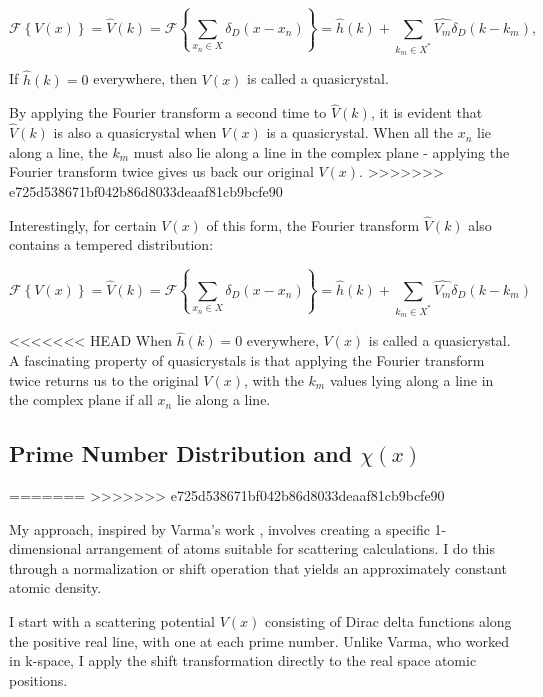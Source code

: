 \documentclass[11pt, oneside]{article}
\begin{document}
\begin{equation}
 \label{eq: RiemannFourier}
 \mathcal{F}\left \{V(x)\right \} = \hat{V}(k) = \mathcal{F}\left \{ \sum_{x_n \in X}\delta_D(x - x_n) \right \} = \hat{h}(k) +  \sum_{k_m \in X^{*}} \hat{V_{m}} \delta_D(k - k_{m}),
\end{equation}

If $\hat{h}(k) = 0$ everywhere, then $V(x)$ is called a quasicrystal.

By applying the Fourier transform a second time to $\hat{V}(k)$, it is evident that $\hat{V}(k)$ is also a quasicrystal when $V(x)$ is a quasicrystal. When all the $x_n$ lie along a line, the $k_m$ must also lie along a line in the complex plane - applying the Fourier transform twice gives us back our original $V(x)$.
>>>>>>> e725d538671bf042b86d8033deaaf81cb9bcfe90

Interestingly, for certain $V(x)$ of this form, the Fourier transform $\hat{V}(k)$ also contains a tempered distribution:
  
\begin{equation}
\label{eq: RiemannFourier}
\mathcal{F}\left \{V(x)\right \} = \hat{V}(k) = \mathcal{F}\left \{ \sum_{x_n \in X}\delta_D(x - x_n) \right \} = \hat{h}(k) +  \sum_{k_m \in X^{*}} \hat{V_{m}} \delta_D(k - k_{m})
\end{equation}

<<<<<<< HEAD
When $\hat{h}(k) = 0$ everywhere, $V(x)$ is called a quasicrystal. A fascinating property of quasicrystals is that applying the Fourier transform twice returns us to the original $V(x)$, with the $k_m$ values lying along a line in the complex plane if all $x_n$ lie along a line.

\subsection{Prime Number Distribution and $\chi(x)$}
=======
>>>>>>> e725d538671bf042b86d8033deaaf81cb9bcfe90

My approach, inspired by Varma's work \cite{Varma2016}, involves creating a specific 1-dimensional arrangement of atoms suitable for scattering calculations. I do this through a normalization or shift operation that yields an approximately constant atomic density.

I start with a scattering potential $V(x)$ consisting of Dirac delta functions along the positive real line, with one at each prime number. Unlike Varma, who worked in k-space, I apply the shift transformation directly to the real space atomic positions.
\end{document}
